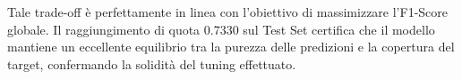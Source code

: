 \noindent
Tale trade-off è perfettamente in linea con l'obiettivo di massimizzare l'F1-Score globale. Il raggiungimento di quota 0.7330 sul Test Set certifica che il modello mantiene un eccellente equilibrio tra la purezza delle predizioni e la copertura del target, confermando la solidità del tuning effettuato.

